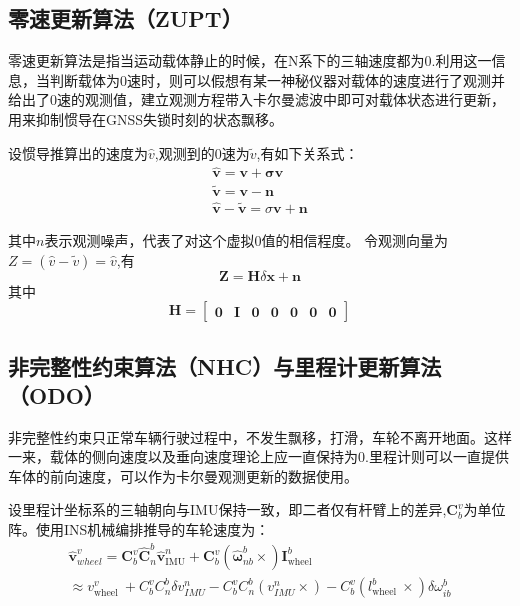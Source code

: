 \documentclass[codepkg=listings,theme=fancy]{course-report}
\begin{document}
\subsection{零速更新算法（ZUPT）}
零速更新算法是指当运动载体静止的时候，在N系下的三轴速度都为0.利用这一信息，当判断载体为0速时，则可以假想有某一神秘仪器对载体的速度进行了观测并给出了0速的观测值，建立观测方程带入卡尔曼滤波中即可对载体状态进行更新，用来抑制惯导在GNSS失锁时刻的状态飘移。

设惯导推算出的速度为$\hat{v}$,观测到的0速为$\tilde{v}$,有如下关系式：
\begin{gather}
\bm{\hat{v}}=\bm{v}+\bm{\sigma v}\\
\bm{\tilde{v}}=\bm{v}-\bm{n}\\
\bm{\hat{v}}-\bm{\tilde{v}}=\sigma \bm{v}+\bm{n}
\end{gather}

其中$n$表示观测噪声，代表了对这个虚拟0值的相信程度。
令观测向量为$Z=(\hat{v}-\tilde{v})=\hat{v}$,有
\begin{equation}
\bm{Z}=\bm{H}\delta \boldsymbol{x}+\bm{n}
\end{equation}
其中
\begin{equation}
\bm{H}=\begin{bmatrix}
\bm{0}&\bm{I}&\bm{0}&\bm{0}&\bm{0}&\bm{0}&\bm{0}
\end{bmatrix}
\end{equation}

\subsection{非完整性约束算法（NHC）与里程计更新算法（ODO）}
非完整性约束只正常车辆行驶过程中，不发生飘移，打滑，车轮不离开地面。这样一来，载体的侧向速度以及垂向速度理论上应一直保持为0.里程计则可以一直提供车体的前向速度，可以作为卡尔曼观测更新的数据使用。

设里程计坐标系的三轴朝向与IMU保持一致，即二者仅有杆臂上的差异,$\mathbf{C}_{b}^{v}$为单位阵。使用INS机械编排推导的车轮速度为：
\begin{equation}
\begin{array}{l}
\hat{\boldsymbol{v}}^v_{wheel}=\mathbf{C}_{b}^{v} \hat{\mathbf{C}}_{n}^{b} \hat{\boldsymbol{v}}_{\text {IMU}}^{n}+\mathbf{C}_{b}^{v}\left(\hat{\boldsymbol{\omega}}_{n b}^{b} \times\right) \boldsymbol{I}_{\text {wheel }}^{b} \\
\approx v_{\text {wheel }}^{v}+C_{b}^{v} C_{n}^{b} \delta v_{I M U}^{n}-C_{b}^{v} C_{n}^{b}\left(v_{I M U}^{n} \times\right)-C_{b}^{v}\left(l_{\text {wheel }}^{b} \times\right) \delta \omega_{i b}^{b} \\
\end{array}
\end{equation}
\end{document}
